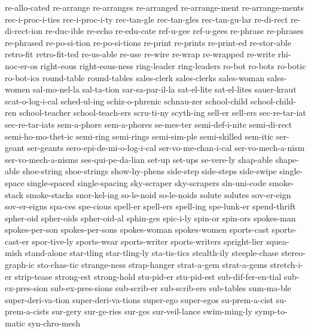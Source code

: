 {{{  re-allo-cated
  re-arrange
  re-arranges
  re-arranged
  re-arrange-ment
  re-arrange-ments
  rec-i-proc-i-ties
  rec-i-proc-i-ty
  rec-tan-gle
  rec-tan-gles
  rec-tan-gu-lar
  re-di-rect
  re-di-rect-ion
  re-duc-ible
  re-echo
  re-edu-cate
  ref-u-gee
  ref-u-gees
  re-phrase
  re-phrases
  re-phrased
  re-po-si-tion
  re-po-si-tions
  re-print
  re-prints
  re-print-ed
  re-stor-able
  retro-fit
  retro-fit-ted
  re-us-able
  re-use
  re-wire
  re-wrap
  re-wrapped
  re-write
  rhi-noc-er-os
  right-eous
  right-eous-ness
  ring-leader
  ring-leaders
  ro-bot
  ro-bots
  ro-botic
  ro-bot-ics
  round-table
  round-tables
  sales-clerk
  sales-clerks
  sales-woman
  sales-women
  sal-mo-nel-la
  sal-ta-tion
  sar-sa-par-il-la
  sat-el-lite
  sat-el-lites
  sauer-kraut
  scat-o-log-i-cal
  sched-ul-ing
  schiz-o-phrenic
  schnau-zer
  school-child
  school-child-ren
  school-teacher
  school-teach-ers
  scru-ti-ny
  scyth-ing
  sell-er
  sell-ers
  sec-re-tar-iat
  sec-re-tar-iats
  sem-a-phore
  sem-a-phores
  se-mes-ter
  semi-def-i-nite
  semi-di-rect
  semi-ho-mo-thet-ic
  semi-ring
  semi-rings
  semi-sim-ple
  semi-skilled
  sem-itic
  ser-geant
  ser-geants
  sero-epi-de-mi-o-log-i-cal
  ser-vo-me-chan-i-cal
  ser-vo-mech-a-nism
  ser-vo-mech-a-nisms
  ses-qui-pe-da-lian
  set-up
  set-ups
  se-vere-ly
  shap-able
  shape-able
  shoe-string
  shoe-strings
  show-hy-phens
  side-step
  side-steps
  side-swipe
  single-space
  single-spaced
  single-spacing
  sky-scraper
  sky-scrapers
  sln-uni-code
  smoke-stack
  smoke-stacks
  snor-kel-ing
  so-le-noid
  so-le-noids
  solute
  solutes
  sov-er-eign
  sov-er-eigns
  spa-ces
  spe-cious
  spell-er
  spell-ers
  spell-ing
  spe-lunk-er
  spend-thrift
  spher-oid
  spher-oids
  spher-oid-al
  sphin-ges
  spic-i-ly
  spin-or
  spin-ors
  spokes-man
  spokes-per-son
  spokes-per-sons
  spokes-woman
  spokes-women
  sports-cast
  sports-cast-er
  spor-tive-ly
  sports-wear
  sports-writer
  sports-writers
  spright-lier
  squea-mish
  stand-alone
  star-tling
  star-tling-ly
  sta-tis-tics
  stealth-ily
  steeple-chase
  stereo-graph-ic
  sto-chas-tic
  strange-ness
  strap-hanger
  strat-a-gem
  strat-a-gems
  stretch-i-er
  strip-tease
  strong-est
  strong-hold
  stu-pid-er
  stu-pid-est
  sub-dif-fer-en-tial
  sub-ex-pres-sion
  sub-ex-pres-sions
  sub-scrib-er
  sub-scrib-ers
  sub-tables
  sum-ma-ble
  super-deri-va-tion
  super-deri-va-tions
  super-ego
  super-egos
  su-prem-a-cist
  su-prem-a-cists
  sur-gery
  sur-ge-ries
  sur-ges
  sur-veil-lance
  swim-ming-ly
  symp-to-matic
  syn-chro-mesh
}}}
